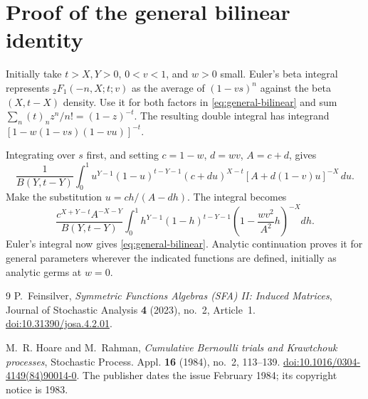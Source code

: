 \documentclass[11pt,reqno]{amsart}
\theoremstyle{remark}\newtheorem{remark}[theorem]{Remark}
\begin{document}
\appendix
\section{Proof of the general bilinear identity}\label{app:bilinear}
Initially take $t>X,Y>0$, $0<v<1$, and $w>0$ small. Euler's beta
integral represents ${}_2F_1(-n,X;t;v)$ as the average of $(1-vs)^n$
against the beta$(X,t-X)$ density. Use it for both factors in
\eqref{eq:general-bilinear} and sum
$\sum_n(t)_nz^n/n!=(1-z)^{-t}$. The resulting double integral has
integrand $[1-w(1-vs)(1-vu)]^{-t}$.

Integrating over $s$ first, and setting $c=1-w$, $d=wv$, $A=c+d$,
gives
\[
\frac1{B(Y,t-Y)}\int_0^1
u^{Y-1}(1-u)^{t-Y-1}
(c+du)^{X-t}[A+d(1-v)u]^{-X}\,du.
\]
Make the substitution $u=ch/(A-dh)$. The integral becomes
\[
\frac{c^{X+Y-t}A^{-X-Y}}{B(Y,t-Y)}\int_0^1
h^{Y-1}(1-h)^{t-Y-1}
\left(1-\frac{wv^2}{A^2}h\right)^{-X}dh.
\]
Euler's integral now gives \eqref{eq:general-bilinear}. Analytic
continuation proves it for general parameters wherever the indicated
functions are defined, initially as analytic germs at $w=0$.


\begin{thebibliography}{9}
P.~Feinsilver, \emph{Symmetric Functions Algebras (SFA) II: Induced
Matrices}, Journal of Stochastic Analysis \textbf{4} (2023), no.~2,
Article~1.
\href{https://doi.org/10.31390/josa.4.2.01}{doi:10.31390/josa.4.2.01}.

M.~R. Hoare and M.~Rahman, \emph{Cumulative Bernoulli trials and
Krawtchouk processes}, Stochastic Process. Appl. \textbf{16} (1984),
no.~2, 113--139.
\href{https://doi.org/10.1016/0304-4149(84)90014-0}{doi:10.1016/0304-4149(84)90014-0}.
The publisher dates the issue February 1984; its copyright notice is 1983.

\end{thebibliography}
\end{document}
